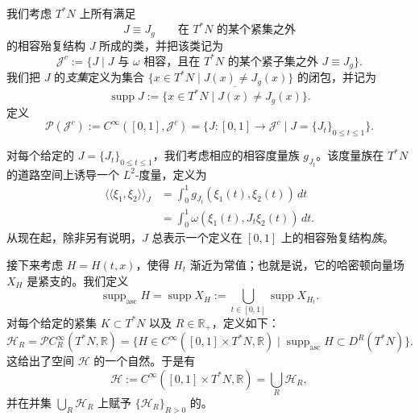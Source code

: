 我们考虑 $T^*N$ 上所有满足
\[
  J\equiv J_g\qquad\text{在 $T^*N$ 的某个紧集之外}
\]
的相容殆复结构 $J$ 所成的类，并把该类记为
\[
  \mathcal J^c
  :=\{J\mid J\text{ 与 $\omega$ 相容，且在 $T^*N$ 的某个紧子集之外 }J\equiv J_g\}.
\]
我们把 $J$ 的\emph{支集}定义为集合 $\{x\in T^*N\mid J(x)\ne J_g(x)\}$ 的闭包，并记为
\[
  \operatorname{supp}J
  :=\overline{\{x\in T^*N\mid J(x)\ne J_g(x)\}}.
\]
定义
\[
  \mathcal P(\mathcal J^c)
  :=C^\infty([0,1],\mathcal J^c)
  =\{J:[0,1]\to\mathcal J^c\mid J=\{J_t\}_{0\le t\le1}\}.
\]

对每个给定的 $J=\{J_t\}_{0\le t\le1}$，我们考虑相应的相容度量族 $g_{J_t}$。该度量族在 $T^*N$ 的道路空间上诱导一个 $L^2$-度量，定义为
\begin{equation}
\begin{split}
  \langle\!\langle\xi_1,\xi_2\rangle\!\rangle_J
  &=\int_0^1 g_{J_t}(\xi_1(t),\xi_2(t))\,dt\\
  &=\int_0^1\omega(\xi_1(t),J_t\xi_2(t))\,dt.
\end{split}
\label{eq:path-space-l2-metric}
\end{equation}
从现在起，除非另有说明，$J$ 总表示一个定义在 $[0,1]$ 上的相容殆复结构\emph{族}。

接下来考虑 $H=H(t,x)$，使得 $H_t$ 渐近为常值；也就是说，它的哈密顿向量场 $X_H$ 是紧支的。我们定义
\[
  \operatorname{supp}_{\mathrm{asc}}H
  =\operatorname{supp}X_H
  :=\bigcup_{t\in[0,1]}\operatorname{supp}X_{H_t}.
\]
对每个给定的紧集 $K\subset T^*N$ 以及 $R\in\mathbb R_+$，定义如下：
\begin{equation}
  \mathcal H_R
  =\mathcal P C_R^\infty(T^*N,\mathbb R)
  =\{H\in C^\infty([0,1]\times T^*N,\mathbb R)
      \mid\operatorname{supp}_{\mathrm{asc}}H\subset D^R(T^*N)\}.
  \label{eq:filtered-hamiltonian-space}
\end{equation}
这给出了空间 $\mathcal H$ 的一个自然\termFiltration{}。于是有
\[
  \mathcal H
  :=C^\infty([0,1]\times T^*N,\mathbb R)
  =\bigcup_R\mathcal H_R,
\]
并在并集 $\bigcup_R\mathcal H_R$ 上赋予 $\{\mathcal H_R\}_{R>0}$ 的\termDirectLimitTopology{}。


